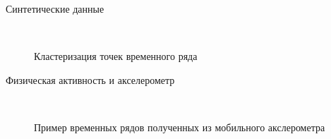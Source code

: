 \documentclass{beamer}
\begin{document}
\begin{frame}{Синтетические данные}
	\begin{figure}[h!t]\center
		\\
		\caption{Кластеризация точек временного ряда}
	\end{figure}
\end{frame}
\begin{frame}{Физическая активность и акселерометр}
	\begin{figure}[h!t]\center
		\\
		\caption{Пример временных рядов полученных из мобильного акслерометра}
	\end{figure}
\end{frame}
\end{document}
